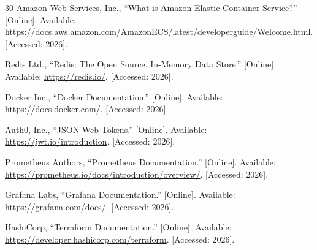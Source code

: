 \begin{thebibliography}{30}
Amazon Web Services, Inc., ``What is Amazon Elastic Container Service?'' [Online]. Available: \url{https://docs.aws.amazon.com/AmazonECS/latest/developerguide/Welcome.html}. [Accessed: 2026].

Redis Ltd., ``Redis: The Open Source, In-Memory Data Store.'' [Online]. Available: \url{https://redis.io/}. [Accessed: 2026].

Docker Inc., ``Docker Documentation.'' [Online]. Available: \url{https://docs.docker.com/}. [Accessed: 2026].

Auth0, Inc., ``JSON Web Tokens.'' [Online]. Available: \url{https://jwt.io/introduction}. [Accessed: 2026].

Prometheus Authors, ``Prometheus Documentation.'' [Online]. Available: \url{https://prometheus.io/docs/introduction/overview/}. [Accessed: 2026].

Grafana Labs, ``Grafana Documentation.'' [Online]. Available: \url{https://grafana.com/docs/}. [Accessed: 2026].

HashiCorp, ``Terraform Documentation.'' [Online]. Available: \url{https://developer.hashicorp.com/terraform}. [Accessed: 2026].

\end{thebibliography}
\endgroup
